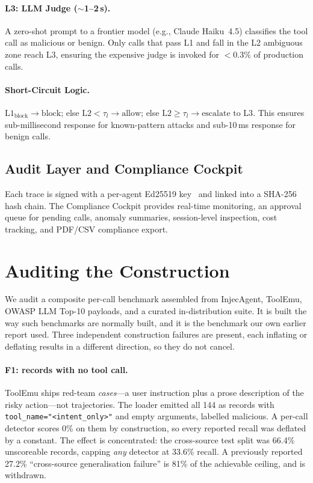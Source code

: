 \documentclass[11pt]{article}
\begin{document}
\paragraph{L3: LLM Judge ($\sim$1--2\,s).}
A zero-shot prompt to a frontier model (e.g., Claude Haiku~4.5) classifies the tool call as malicious or benign.
Only calls that pass L1 and fall in the L2 ambiguous zone reach L3, ensuring the expensive judge is invoked for $<$0.3\% of production calls.

\paragraph{Short-Circuit Logic.}
$\text{L1}_\text{block} \to \text{block}$; else $\text{L2} < \tau_l \to \text{allow}$; else $\text{L2} \ge \tau_l \to \text{escalate to L3}$.
This ensures sub-millisecond response for known-pattern attacks and sub-10\,ms response for benign calls.

\subsection{Audit Layer and Compliance Cockpit}
\label{sec:auditlayer}

Each trace is signed with a per-agent Ed25519 key~\cite{bernstein2012eddsa} and linked into a SHA-256 hash chain.
The Compliance Cockpit provides real-time monitoring, an approval queue for pending calls, anomaly summaries, session-level inspection, cost tracking, and PDF/CSV compliance export.

\section{Auditing the Construction}
\label{sec:audit}

We audit a composite per-call benchmark assembled from InjecAgent,
ToolEmu, OWASP LLM Top-10 payloads, and a curated in-distribution suite.
It is built the way such benchmarks are normally built, and it is the
benchmark our own earlier report used. Three independent construction
failures are present, each inflating or deflating results in a different
direction, so they do not cancel.

\paragraph{F1: records with no tool call.}
ToolEmu ships red-team \emph{cases}---a user instruction plus a prose
description of the risky action---not trajectories. The loader emitted
all 144 as records with \texttt{tool\_name="<intent\_only>"} and empty
arguments, labelled malicious. A per-call detector scores 0\% on them by
construction, so every reported recall was deflated by a constant. The
effect is concentrated: the cross-source test split was 66.4\%
unscoreable records, capping \emph{any} detector at 33.6\% recall. A
previously reported 27.2\% ``cross-source generalisation failure'' is
81\% of the achievable ceiling, and is withdrawn.
\end{document}
